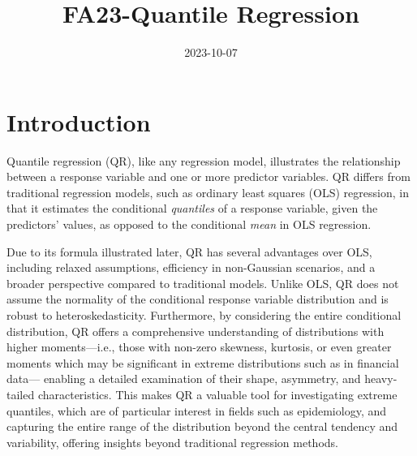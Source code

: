 \documentclass[
  letterpaper,
  DIV=11,
  numbers=noendperiod]{scrreprt}
\title{FA23-Quantile Regression}
\author{}
\date{2023-10-07}
\renewcommand*\contentsname{Table of contents}
\newcommand\contentsname{Table of contents}
\begin{document}
\maketitle
\ifdefined\Shaded\renewenvironment{Shaded}{\begin{tcolorbox}[interior hidden, enhanced, breakable, sharp corners, boxrule=0pt, borderline west={3pt}{0pt}{shadecolor}, frame hidden]}{\end{tcolorbox}}\fi

\renewcommand*\contentsname{Table of contents}
{
\hypersetup{linkcolor=}
\setcounter{tocdepth}{2}
\tableofcontents
}

\hypertarget{section}{%
\chapter{}\label{section}}


\hypertarget{introduction}{%
\chapter{Introduction}\label{introduction}}

Quantile regression (QR), like any regression model, illustrates the
relationship between a response variable and one or more predictor
variables. QR differs from traditional regression models, such as
ordinary least squares (OLS) regression, in that it estimates the
conditional \textit{quantiles} of a response variable, given the
predictors' values, as opposed to the conditional \textit{mean} in OLS
regression.

Due to its formula illustrated later, QR has several advantages over
OLS, including relaxed assumptions, efficiency in non-Gaussian
scenarios, and a broader perspective compared to traditional models.
Unlike OLS, QR does not assume the normality of the conditional response
variable distribution and is robust to heteroskedasticity. Furthermore,
by considering the entire conditional distribution, QR offers a
comprehensive understanding of distributions with higher moments---i.e.,
those with non-zero skewness, kurtosis, or even greater moments which
may be significant in extreme distributions such as in financial data---
enabling a detailed examination of their shape, asymmetry, and
heavy-tailed characteristics. This makes QR a valuable tool for
investigating extreme quantiles, which are of particular interest in
fields such as epidemiology, and capturing the entire range of the
distribution beyond the central tendency and variability, offering
insights beyond traditional regression methods.
\end{document}
